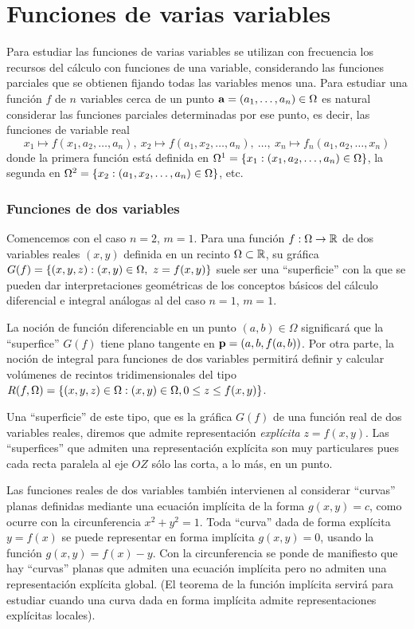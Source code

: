 \section{Funciones de varias variables}

Para estudiar las funciones de varias variables se utilizan con frecuencia los recursos del cálculo con funciones de una variable, considerando las funciones parciales que se obtienen fijando todas las variables menos una. Para estudiar una función $f$ de $n$ variables cerca de un punto $\mathbf{a}=(a_1,\dots,a_n)\in\Omega$ es natural considerar las funciones parciales determinadas por ese punto, es decir, las funciones de variable real
$$x_1\mapsto f(x_1,a_2,\dots,a_n), \ x_2\mapsto f(a_1,x_2,\dots,a_n), \ \dots, \ x_n\mapsto f_n(a_1,a_2,\dots,x_n)$$
donde la primera función está definida en $\Omega^1=\left\lbrace x_1 : (x_1,a_2,\dots,a_n)\in \Omega\right\rbrace$, la segunda en $\Omega^2=\left\lbrace x_2 : (a_1,x_2,\dots,a_n)\in\Omega\right\rbrace$, etc.

\subsubsection*{Funciones de dos variables}
Comencemos con el caso $n=2$, $m=1$. Para una función $f:\Omega\rightarrow\mathbb{R}$ de dos variables reales $(x,y)$ definida en un recinto $\Omega\subset\mathbb{R}$, su gráfica $G(f)=\conj{(x,y,z): (x,y)\in\Omega, \ z=f(x,y)}$ suele ser una ``superficie'' con la que se pueden dar interpretaciones geométricas de los conceptos básicos del cálculo diferencial e integral análogas al del caso $n=1$, $m=1$.

La noción de función diferenciable en un punto $(a,b)\in\Omega$ significará que la ``superfice'' $G(f)$ tiene plano tangente en $\mathbf{p}=(a,b,f(a,b))$. Por otra parte, la noción de integral para funciones de dos variables permitirá definir y calcular volúmenes de recintos tridimensionales del tipo $R(f,\Omega)=\left\lbrace(x,y,z)\in\Omega : (x,y)\in\Omega, 0\leq z\leq f(x,y)\right\rbrace$.

Una ``superficie'' de este tipo, que es la gráfica $G(f)$ de una función real de dos variables reales, diremos que admite representación {\it explícita} $z=f(x,y)$. Las ``superfices'' que admiten una representación explícita son muy particulares pues cada recta paralela al eje $OZ$ sólo las corta, a lo más, en un punto.

Las funciones reales de dos variables también intervienen al considerar ``curvas'' planas definidas mediante una ecuación implícita de la forma $g(x,y)=c$, como ocurre con la circunferencia $x^2+y^2=1$. Toda ``curva'' dada de forma explícita $y=f(x)$ se puede representar en forma implícita $g(x,y)=0$, usando la función $g(x,y)=f(x)-y$. Con la circunferencia se ponde de manifiesto que hay ``curvas'' planas que admiten una ecuación implícita pero no admiten una representación explícita global. (El teorema de la función implícita servirá para estudiar cuando una curva dada en forma implícita admite representaciones explícitas locales).

